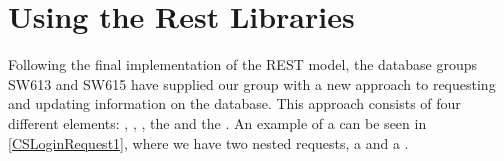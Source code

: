 % 
% 

\section{Using the Rest Libraries}\label{UsingRest}
Following the final implementation of the REST model, the database groups SW613
and SW615 have supplied our group with a new approach to requesting and updating
information on the database. This approach consists of four different
elements: , , ,
the  and the .
An example of a  can be seen in \autoref{CSLoginRequest1},
where we have two nested requests, a  and a
.\nl

